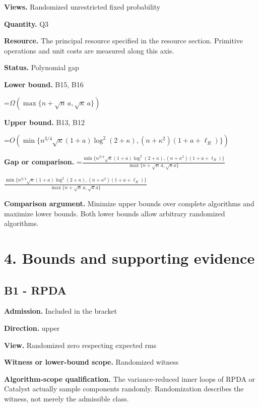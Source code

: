 \documentclass[10pt,a4paper]{article}
\newcommand{\AtlasMath}[1]{\par\begingroup\centering\setbox0=\hbox{$\displaystyle #1$}\ifdim\wd0>1.4\linewidth\typeout{ATLAS WIDE FORMULA: \the\wd0}\fi\ifdim\wd0>\linewidth\resizebox{\linewidth}{!}{\box0}\else\box0\fi\par\endgroup}
\newcommand{\AtlasInlineMath}[1]{\begingroup\setbox0=\hbox{$#1$}\ifdim\wd0>.4\linewidth\endgroup\AtlasMath{#1}\else\endgroup$#1$\fi}
\begin{document}
\textbf{Views.} Randomized unrestricted fixed probability



\textbf{Quantity.} Q3



\textbf{Resource.} The principal resource specified in the resource section. Primitive operations and unit costs are measured along this axis.



\textbf{Status.} Polynomial gap



\textbf{Lower bound.} B15, B16



\AtlasMath{\Omega\!\left(\max\{n+\sqrt n\,a,\sqrt\kappa\,a\}\right)}


\textbf{Upper bound.} B13, B12



\AtlasMath{O\!\left(\min\{n^{3/4}\sqrt\kappa(1+a)\log^2(2+\kappa),(n+\kappa^2)(1+a+\ell_R)\}\right)}


\textbf{Gap or comparison.} \AtlasInlineMath{\frac{\min\{n^{3/4}\sqrt\kappa(1+a)\log^2(2+\kappa),(n+\kappa^2)(1+a+\ell_R)\}}{\max\{n+\sqrt n\,a,\sqrt\kappa a\}}}



\textbf{Comparison argument.} Minimize upper bounds over complete algorithms and maximize lower bounds. Both lower bounds allow arbitrary randomized algorithms.



\section{4. Bounds and supporting evidence}


\subsection{B1 - RPDA}


\textbf{Admission.} Included in the bracket



\textbf{Direction.} upper



\textbf{View.} Randomized zero respecting expected rms



\textbf{Witness or lower-bound scope.} Randomized witness



\textbf{Algorithm-scope qualification.} The variance-reduced inner loops of RPDA or Catalyst actually sample components randomly. Randomization describes the witness, not merely the admissible class.
\end{document}
